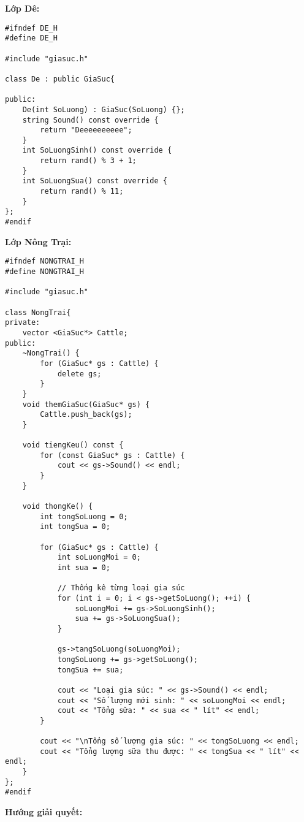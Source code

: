 \item {\textbf{Lớp Dê: }}
\begin{verbatim}
#ifndef DE_H
#define DE_H

#include "giasuc.h"

class De : public GiaSuc{

public: 
    De(int SoLuong) : GiaSuc(SoLuong) {};
    string Sound() const override {
        return "Deeeeeeeeee";
    }
    int SoLuongSinh() const override {
        return rand() % 3 + 1;
    }
    int SoLuongSua() const override {
        return rand() % 11;
    }
};
#endif
\end{verbatim}
\item {\textbf{Lớp Nông Trại: }}
\begin{verbatim}
#ifndef NONGTRAI_H
#define NONGTRAI_H

#include "giasuc.h"

class NongTrai{
private: 
    vector <GiaSuc*> Cattle;
public: 
    ~NongTrai() {
        for (GiaSuc* gs : Cattle) {
            delete gs;
        }
    }
    void themGiaSuc(GiaSuc* gs) {
        Cattle.push_back(gs);
    }

    void tiengKeu() const {
        for (const GiaSuc* gs : Cattle) {
            cout << gs->Sound() << endl;
        }
    }

    void thongKe() {
        int tongSoLuong = 0;
        int tongSua = 0;

        for (GiaSuc* gs : Cattle) {
            int soLuongMoi = 0;
            int sua = 0;

            // Thống kê từng loại gia súc
            for (int i = 0; i < gs->getSoLuong(); ++i) {
                soLuongMoi += gs->SoLuongSinh();
                sua += gs->SoLuongSua();
            }

            gs->tangSoLuong(soLuongMoi);
            tongSoLuong += gs->getSoLuong();
            tongSua += sua;

            cout << "Loại gia súc: " << gs->Sound() << endl;
            cout << "Số lượng mới sinh: " << soLuongMoi << endl;
            cout << "Tổng sữa: " << sua << " lít" << endl;
        }

        cout << "\nTổng số lượng gia súc: " << tongSoLuong << endl;
        cout << "Tổng lượng sữa thu được: " << tongSua << " lít" << endl;
    }
};
#endif
\end{verbatim}
\item{\textbf{Hướng giải quyết:}}
